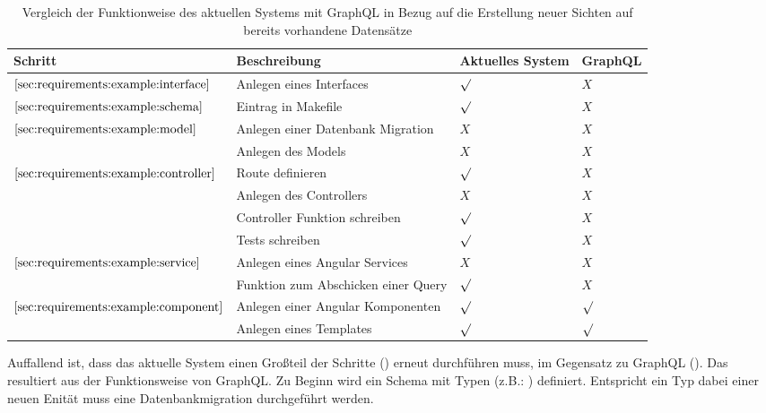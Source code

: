 \begin{table}[h!]
    \begin{tabular}{|p{}|p{}|p{}|p{}|}
        \hline
        \textbf{Schritt} & \textbf{Beschreibung} & \textbf{Aktuelles \newline System} & \textbf{GraphQL} \\ \hline
        $\ref{sec:requirements:example:interface}$ & Anlegen eines Interfaces & $\surd$ &  $X$ \\ \hline
        $\ref{sec:requirements:example:schema}$ & Eintrag in Makefile & $\surd$ &  $X$ \\ \hline
        \multirow{2}{*}{$\ref{sec:requirements:example:model}$}
        & Anlegen einer Datenbank Migration & $X$ &  $X$ \\
        & Anlegen des Models & $X$ &  $X$ \\ \hline
        \multirow{4}{*}{$\ref{sec:requirements:example:controller}$}
        & Route definieren & $\surd$ &  $X$ \\
        & Anlegen des Controllers & $X$ &  $X$ \\
        & Controller Funktion schreiben & $\surd$ &  $X$ \\
        & Tests schreiben & $\surd$ &  $X$ \\ \hline
        \multirow{2}{*}{$\ref{sec:requirements:example:service}$}
        & Anlegen eines Angular Services & $X$ &  $X$ \\
        & Funktion zum Abschicken einer Query & $\surd$ &  $X$ \\ \hline
        \multirow{2}{*}{$\ref{sec:requirements:example:component}$}
        & Anlegen einer Angular Komponenten & $\surd$ &  $\surd$ \\
        & Anlegen eines Templates & $\surd$ &  $\surd$ \\ \hline
    \end{tabular}
    \vspace{5pt}
    \caption{Vergleich der Funktionweise des aktuellen Systems mit GraphQL in Bezug auf die Erstellung neuer Sichten auf bereits vorhandene Datensätze}
    \label{tbl:newview}
\end{table}

Auffallend ist, dass das aktuelle System einen Großteil der Schritte () erneut durchführen muss, im Gegensatz zu
GraphQL (). Das resultiert aus der Funktionsweise von GraphQL.
Zu Beginn wird ein Schema mit Typen (z.B.: ) definiert.
Entspricht ein Typ dabei einer neuen Enität muss eine Datenbankmigration durchgeführt werden.

